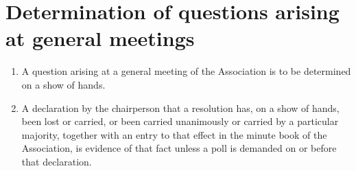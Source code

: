 \section{Determination of questions arising at general meetings}
\label{rule:questions}

\begin{enumerate}
	\item A question arising at a general meeting of the Association is to be determined on a show of hands.
	\item A declaration by the chairperson that a resolution has, on a show of hands, been lost or carried, or been carried unanimously or carried by a particular majority, together with an entry to that effect in the minute book of the Association, is evidence of that fact unless a poll is demanded on or before that declaration.
\end{enumerate}